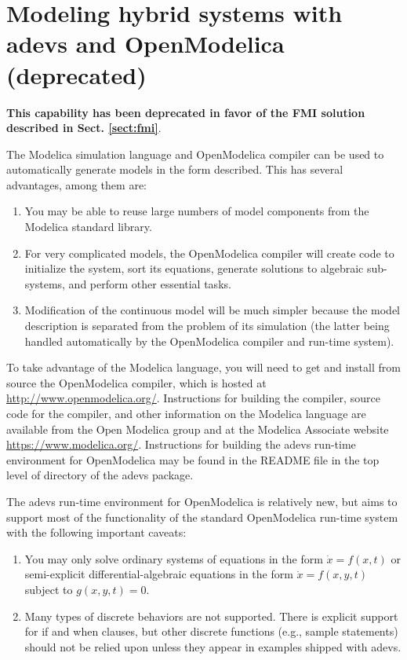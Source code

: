 \section{Modeling hybrid systems with adevs and OpenModelica (deprecated)}

{\bf This capability has been deprecated in favor of the FMI solution described in Sect. \ref{sect:fmi}}.

The Modelica simulation language and OpenModelica compiler can be used to automatically generate models in the form described. This has several advantages, among them are:
\begin{enumerate}
\item You may be able to reuse large numbers of model components from the Modelica standard library.
\item For very complicated models, the OpenModelica compiler will create code to initialize the system, sort its equations, generate solutions to algebraic sub-systems, and perform other essential tasks.
\item Modification of the continuous model will be much simpler because the model description is separated from the problem of its simulation (the latter being handled automatically by the OpenModelica compiler and run-time system).
\end{enumerate}

To take advantage of the Modelica language, you will need to get and install from source the OpenModelica compiler, which is hosted at \url{http://www.openmodelica.org/}. Instructions for building the compiler, source code for the compiler, and other information on the Modelica language are available from the Open Modelica group and at the Modelica Associate website \url{https://www.modelica.org/}. Instructions for building the adevs run-time environment for OpenModelica may be found in the README file in the top level of directory of the adevs package.

The adevs run-time environment for OpenModelica is relatively new, but aims to support most of the functionality of the standard OpenModelica run-time system with the following important caveats:
\begin{enumerate}
\item You may only solve ordinary systems of equations in the form $\dot{x}=f(x,t)$ or semi-explicit differential-algebraic equations in the form $\dot{x}=f(x,y,t)$ subject to $g(x,y,t)=0$.
\item Many types of discrete behaviors are not supported. There is explicit support for if and when clauses, but other discrete functions (e.g., sample statements) should not be relied upon unless they appear in examples shipped with adevs.
\end{enumerate}

